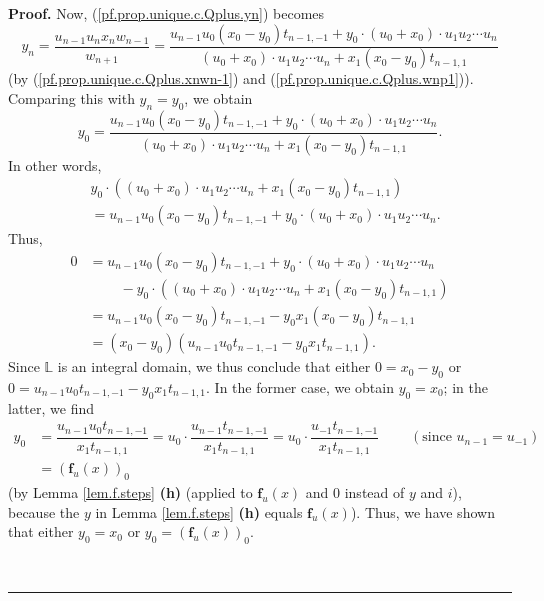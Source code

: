 \documentclass[numbers=enddot,12pt,final,onecolumn,notitlepage]{scrartcl}%
\theoremstyle{definition}
\newenvironment{proof}[1][Proof]{\noindent\textbf{#1.} }{\ \rule{0.5em}{0.5em}}
\newenvironment{verlong}{}{}
\begin{document}
\begin{verlong}
\begin{proof}
Now, (\ref{pf.prop.unique.c.Qplus.yn}) becomes%
\[
y_{n}=\dfrac{u_{n-1}u_{n}x_{n}w_{n-1}}{w_{n+1}}=\dfrac{u_{n-1}u_{0}\left(
x_{0}-y_{0}\right)  t_{n-1,-1}+y_{0}\cdot\left(  u_{0}+x_{0}\right)  \cdot
u_{1}u_{2}\cdots u_{n}}{\left(  u_{0}+x_{0}\right)  \cdot u_{1}u_{2}\cdots
u_{n}+x_{1}\left(  x_{0}-y_{0}\right)  t_{n-1,1}}%
\]
(by (\ref{pf.prop.unique.c.Qplus.xnwn-1}) and
(\ref{pf.prop.unique.c.Qplus.wnp1})). Comparing this with $y_{n}=y_{0}$, we
obtain%
\[
y_{0}=\dfrac{u_{n-1}u_{0}\left(  x_{0}-y_{0}\right)  t_{n-1,-1}+y_{0}%
\cdot\left(  u_{0}+x_{0}\right)  \cdot u_{1}u_{2}\cdots u_{n}}{\left(
u_{0}+x_{0}\right)  \cdot u_{1}u_{2}\cdots u_{n}+x_{1}\left(  x_{0}%
-y_{0}\right)  t_{n-1,1}}.
\]
In other words,%
\begin{align*}
&  y_{0}\cdot\left(  \left(  u_{0}+x_{0}\right)  \cdot u_{1}u_{2}\cdots
u_{n}+x_{1}\left(  x_{0}-y_{0}\right)  t_{n-1,1}\right) \\
&  =u_{n-1}u_{0}\left(  x_{0}-y_{0}\right)  t_{n-1,-1}+y_{0}\cdot\left(
u_{0}+x_{0}\right)  \cdot u_{1}u_{2}\cdots u_{n}.
\end{align*}
Thus,%
\begin{align*}
0  &  =u_{n-1}u_{0}\left(  x_{0}-y_{0}\right)  t_{n-1,-1}+y_{0}\cdot\left(
u_{0}+x_{0}\right)  \cdot u_{1}u_{2}\cdots u_{n}\\
&  \ \ \ \ \ \ \ \ \ \ -y_{0}\cdot\left(  \left(  u_{0}+x_{0}\right)  \cdot
u_{1}u_{2}\cdots u_{n}+x_{1}\left(  x_{0}-y_{0}\right)  t_{n-1,1}\right) \\
&  =u_{n-1}u_{0}\left(  x_{0}-y_{0}\right)  t_{n-1,-1}-y_{0}x_{1}\left(
x_{0}-y_{0}\right)  t_{n-1,1}\\
&  =\left(  x_{0}-y_{0}\right)  \left(  u_{n-1}u_{0}t_{n-1,-1}-y_{0}%
x_{1}t_{n-1,1}\right)  .
\end{align*}
Since $\mathbb{L}$ is an integral domain, we thus conclude that either
$0=x_{0}-y_{0}$ or $0=u_{n-1}u_{0}t_{n-1,-1}-y_{0}x_{1}t_{n-1,1}$. In the
former case, we obtain $y_{0}=x_{0}$; in the latter, we find
\begin{align*}
y_{0}  &  =\dfrac{u_{n-1}u_{0}t_{n-1,-1}}{x_{1}t_{n-1,1}}=u_{0}\cdot
\dfrac{u_{n-1}t_{n-1,-1}}{x_{1}t_{n-1,1}}=u_{0}\cdot\dfrac{u_{-1}t_{n-1,-1}%
}{x_{1}t_{n-1,1}}\ \ \ \ \ \ \ \ \ \ \left(  \text{since }u_{n-1}%
=u_{-1}\right) \\
&  =\left(  \mathbf{f}_{u}\left(  x\right)  \right)  _{0}%
\end{align*}
(by Lemma \ref{lem.f.steps} \textbf{(h)} (applied to $\mathbf{f}_{u}\left(
x\right)  $ and $0$ instead of $y$ and $i$), because the $y$ in Lemma
\ref{lem.f.steps} \textbf{(h)} equals $\mathbf{f}_{u}\left(  x\right)  $).
Thus, we have shown that either $y_{0}=x_{0}$ or $y_{0}=\left(  \mathbf{f}%
_{u}\left(  x\right)  \right)  _{0}$.


\end{proof}
\end{verlong}
\end{document}
